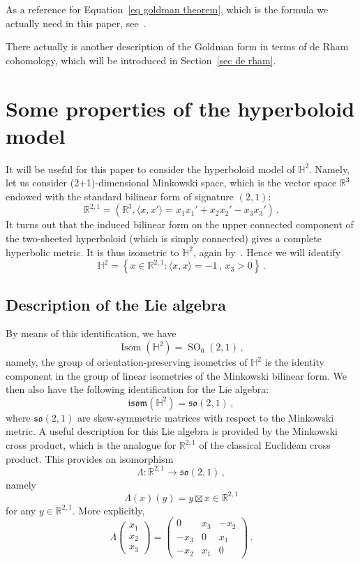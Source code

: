 \documentclass[11pt]{article}
\theoremstyle{definition}
\numberwithin{equation}{section}
\numberwithin{figure}{section}
\numberwithin{table}{section}
\newcommand{\Hyp}{\mathbb{H}}
\newcommand{\R}{{\mathbb R}}
\newcommand{\isom}{\mathfrak{isom}}
\newcommand{\so}{\mathfrak{so}}
\DeclareMathOperator{\Isom}{Isom}
\DeclareMathOperator{\SO}{SO}
\begin{document}
As a reference for Equation~\eqref{eq goldman theorem}, which is the formula we actually need in this paper, see~\cite[Section~2]{bricegt}.

There actually is another description of the Goldman form in terms of de Rham cohomology, which will be introduced in Section~\ref{sec de rham}.



\section{Some properties of the hyperboloid model} \label{sec hyperboloid}
It will be useful for this paper to consider the hyperboloid model of $\Hyp^2$. Namely, let us consider (2+1)-dimensional Minkowski space, which is the vector space $\R^3$ endowed with the standard bilinear form of signature $(2,1)$:
\[
\R^{2,1}=\left(\R^3,\langle x,x'\rangle=x_1x_1'+x_2x_2'-x_3x_3'\right)\,.
\]
It turns out that the induced bilinear form on the upper connected component of the two-sheeted hyperboloid (which is simply connected) gives a complete hyperbolic metric. It is thus isometric to $\Hyp^2$, again by~\cite[Theorem~8.6.2]{opac-b1124711}. Hence we will identify
\[
\Hyp^2=\left\{x\in\R^{2,1}:\langle x,x\rangle=-1\,,\,x_3>0\right\}\,.
\]

\subsection{Description of the Lie algebra}

By means of this identification, we have
\[
\Isom(\Hyp^2)=\SO_0(2,1)\,,
\]
namely, the group of orientation-preserving isometries of $\Hyp^2$ is the identity component in the group of linear isometries of the Minkowski bilinear form. We then also have the following identification for the Lie algebra:
\[
\isom(\Hyp^2)=\so(2,1)\,,
\]
where $\so(2,1)$ are skew-symmetric matrices with respect to the Minkowski metric. A useful description for this Lie algebra is provided by the Minkowski cross product, which is the analogue for $\R^{2,1}$ of the classical Euclidean cross product. This provides an isomorphism
\[
\Lambda:\R^{2,1}\to \so(2,1)\,,
\]
namely
\[
\Lambda(x)(y)=y\boxtimes x\in\R^{2,1}
\]
for any $y\in\R^{2,1}$. More explicitly,
\[
\Lambda
\begin{pmatrix} x_1 \\ x_2 \\ x_3
\end{pmatrix}=
\begin{pmatrix} 0 & x_3 & -x_2 \\ -x_3 & 0 & x_1 \\ -x_2 & x_1 & 0
\end{pmatrix}\,.
\]
\end{document}
